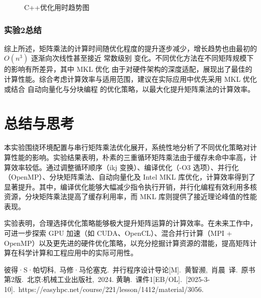 \documentclass[a4paper, utf8]{ctexart}
\begin{document}
\begin{figure}
\begin{minipage}{.32\textwidth}
			\caption{C++优化用时趋势图}
		\end{minipage}
	\end{figure}
	
	\subsubsection{实验2总结}
	
	综上所述，矩阵乘法的计算时间随优化程度的提升逐步减少，增长趋势也由最初的 $O(n^3)$ 逐渐向次线性甚至接近 常数级别 变化。不同优化方法在不同矩阵规模下的影响有所差异，其中 MKL 优化 由于对硬件架构的深度适配，展现出了最佳的计算性能。综合考虑计算效率与适用范围，建议在实际应用中优先采用 MKL 优化 或结合 自动向量化与分块编程 的优化策略，以最大化提升矩阵乘法的计算效率。
	
	\section{总结与思考}
	
	本实验围绕环境配置与串行矩阵乘法优化展开，系统性地分析了不同优化策略对计算性能的影响。实验结果表明，朴素的三重循环矩阵乘法由于缓存未命中率高，计算效率较低。通过调整循环顺序（ikj 变换）、编译优化（-O3 选项）、并行化（OpenMP）、分块矩阵乘法、自动向量化及 Intel MKL 库优化，计算效率得到了显著提升。其中，编译优化能够大幅减少指令执行开销，并行化编程有效利用多核资源，分块矩阵乘法提高了缓存利用率，而 MKL 库则提供了接近理论峰值的性能表现。
	
	实验表明，合理选择优化策略能够极大提升矩阵运算的计算效率。在未来工作中，可进一步探索 GPU 加速（如 CUDA、OpenCL）、混合并行计算（MPI + OpenMP）以及更先进的硬件优化策略，以充分挖掘计算资源的潜能，提高矩阵计算在科学计算和工程应用中的实际可用性。
	
	\let\cleardoublepage\clearpage
	
	\begin{thebibliography}{99}  
		 彼得·S·帕切科,\ 马修·马伦塞克.\ 并行程序设计导论[M].\ 黄智濒,\ 肖晨\ 译.\ 原书第2版.\ 北京:机械工业出版社,\ 2024.
		 黄聃.\ 课件1[EB/OL].\ [2025-3-10].\ https://easyhpc.net/course/221/lesson/1412/material/3056.
	\end{thebibliography}
	
\end{document}
